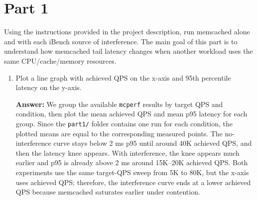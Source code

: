 \section*{Part 1}

Using the instructions provided in the project description, run memcached alone and with each iBench source of interference. The main goal of this part is to understand how memcached tail latency changes when another workload uses the same CPU/cache/memory resources.

\begin{enumerate}[label=(\alph*)]
    \item Plot a line graph with achieved QPS on the x-axis and 95th percentile latency on the y-axis.

    \begin{center}
    \end{center}

    \textbf{Answer:} We group the available \texttt{mcperf} results by target QPS and condition, then plot the mean achieved QPS and mean p95 latency for each group. Since the \texttt{part1/} folder contains one run for each condition, the plotted means are equal to the corresponding measured points. The no-interference curve stays below 2 ms p95 until around 40K achieved QPS, and then the latency knee appears. With interference, the knee appears much earlier and p95 is already above 2 ms around 15K--20K achieved QPS. Both experiments use the same target-QPS sweep from 5K to 80K, but the x-axis uses achieved QPS; therefore, the interference curve ends at a lower achieved QPS because memcached saturates earlier under contention.
\end{enumerate}

